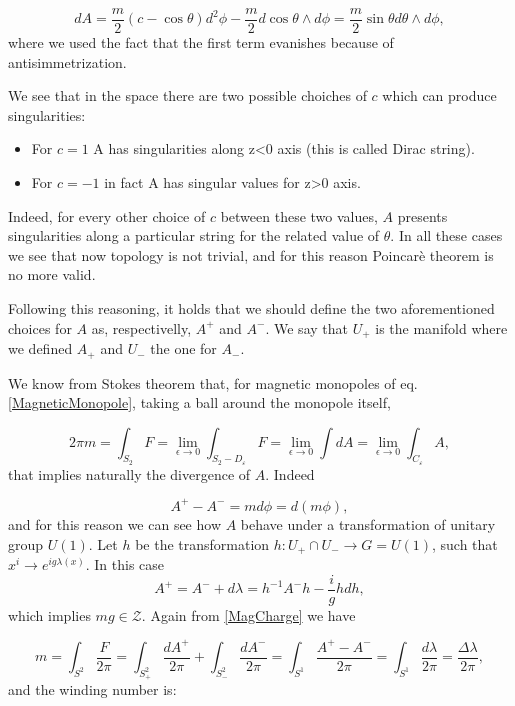 \begin{equation}
dA=\frac{m}{2}\left(c-\cos\theta\right)d^2\phi-\frac{m}{2}d\cos\theta\wedge d \phi=\frac{m}{2}\sin\theta d\theta\wedge d \phi,
\end{equation}
where we used the fact that the first term evanishes because of antisimmetrization.

We see that in the space there are two possible choiches of $c$ which can produce singularities:

\begin{itemize}
\item For $c=1$ A has singularities along z<0 axis (this is called Dirac string).
\item For $c=-1$ in fact A has singular values for z>0 axis.
\end{itemize}
Indeed, for every other choice of $c$ between these two values, $A$ presents singularities along a particular string for the related value of $\theta$. In all these cases we see that now topology is not trivial, and for this reason Poincarè theorem is no more valid.


Following this reasoning, it holds that we should define the two aforementioned choices for $A$ as, respectivelly, $A^+$ and $A^-$. We say that $U_+$ is the manifold where we defined $A_+$ and $U_-$ the one for $A_-$.

We know from Stokes theorem that, for magnetic monopoles of eq. \eqref{MagneticMonopole}, taking a ball around the monopole itself,

\begin{equation}\label{MagCharge}
2\pi m=\int_{S_2} F=\lim_{\epsilon\to 0}\int_{S_2-D_{\varepsilon}}F=\lim_{\epsilon\to 0}\int dA=\lim_{\epsilon\to 0}\int_{C_{\varepsilon}} A,
\end{equation}
that implies naturally the divergence of $A$. Indeed

\begin{equation}
A^+-A^-=md\phi=d(m\phi),
\end{equation}
and for this reason we can see how $A$ behave under a transformation of unitary group $U(1)$.
Let $h$ be the transformation $h:U_+\cap U_- \to G=U(1)$, such that $x^i\to e^{ig\lambda(x)}$. In this case
\begin{equation}
A^+=A^-+d\lambda=h^{-1}A^-h-\frac{i}{g}h dh,
\end{equation}
which implies $mg\in \mathcal{Z}$. Again from \eqref{MagCharge} we have

\begin{equation}
m=\int_{S^2}\frac{F}{2\pi}=\int_{S^2_+}\frac{dA^+}{2\pi}+\int_{S^2_-}\frac{dA^-}{2\pi}=\int_{S^1}\frac{A^+-A^-}{2\pi}=\int_{S^1}\frac{d\lambda}{2\pi}=\frac{\Delta\lambda}{2\pi},
\end{equation}
and the winding number is:

